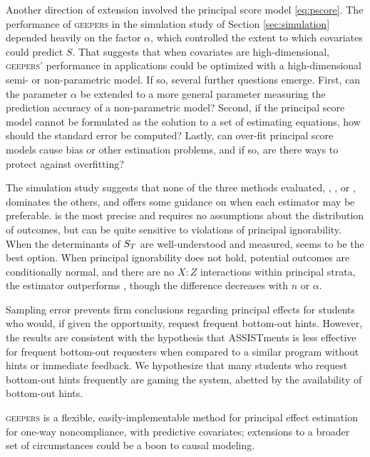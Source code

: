 \documentclass[]{article}
\begin{document}
Another direction of extension involved the principal score model \eqref{eq:pscore}.
The performance of \textsc{geepers} in the simulation study of Section \ref{sec:simulation} depended heavily on the factor $\alpha$, which controlled the extent to which covariates could predict $S$.
That suggests that when covariates are high-dimensional, \textsc{geepers}' performance in applications could be optimized with a high-dimensional semi- or non-parametric model.
If so, several further questions emerge.
First, can the parameter $\alpha$ be extended to a more general parameter measuring the prediction accuracy of a non-parametric model?
Second, if the principal score model cannot be formulated as the solution to a set of estimating equations, how should the standard error be computed?
Lastly, can over-fit principal score models cause bias or other estimation problems, and if so, are there ways to protect against overfitting?

The simulation study suggests that none of the three methods evaluated, \geepers, \nmm, or \psw, dominates the others, and offers some guidance on when each estimator may be preferable. \psw is the most precise and requires no assumptions about the distribution of outcomes, but can be quite sensitive to violations of principal ignorability. When the determinants of $S_T$ are well-understood and measured, \psw seems to be the best option. When principal ignorability does not hold, potential outcomes are conditionally normal, and there are no $X:Z$ interactions within principal strata, the \nmm estimator outperforms \geepers, though the difference decreases with $n$ or $\alpha$. 

Sampling error prevents firm conclusions regarding principal effects for students who would, if given the opportunity, request frequent bottom-out hints.
However, the results are consistent with the hypothesis that ASSISTments is less effective for frequent bottom-out requesters when compared to a similar program without hints or immediate feedback. We hypothesize that many students who request bottom-out hints frequently are gaming the system, abetted by the availability of bottom-out hints.

\textsc{geepers} is a flexible, easily-implementable method for principal effect estimation for one-way noncompliance, with predictive covariates; extensions to a broader set of circumstances could be a boon to causal modeling.



\end{document}
